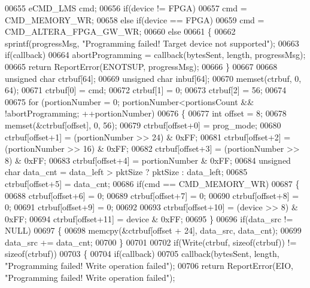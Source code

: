 \begin{DoxyCode}
{{{{{00655     eCMD_LMS cmd;
00656     \textcolor{keywordflow}{if}(device != FPGA)
00657         cmd = CMD_MEMORY_WR;
00658     \textcolor{keywordflow}{else} \textcolor{keywordflow}{if}(device == FPGA)
00659         cmd = CMD_ALTERA_FPGA_GW_WR;
00660     \textcolor{keywordflow}{else}
00661     \{
00662         sprintf(progressMsg, \textcolor{stringliteral}{"Programming failed! Target device not supported"});
00663         \textcolor{keywordflow}{if}(callback)
00664             abortProgramming = callback(bytesSent, length, progressMsg);
00665         \textcolor{keywordflow}{return} ReportError(ENOTSUP, progressMsg);
00666     \}
00667 
00668     \textcolor{keywordtype}{unsigned} \textcolor{keywordtype}{char} ctrbuf[64];
00669     \textcolor{keywordtype}{unsigned} \textcolor{keywordtype}{char} inbuf[64];
00670     memset(ctrbuf, 0, 64);
00671     ctrbuf[0] = cmd;
00672     ctrbuf[1] = 0;
00673     ctrbuf[2] = 56;
00674 
00675     \textcolor{keywordflow}{for} (portionNumber = 0; portionNumber<portionsCount && !abortProgramming; ++portionNumber)
00676     \{
00677         \textcolor{keywordtype}{int} offset = 8;
00678         memset(&ctrbuf[offset], 0, 56);
00679         ctrbuf[offset+0] = prog\_mode;
00680         ctrbuf[offset+1] = (portionNumber >> 24) & 0xFF;
00681         ctrbuf[offset+2] = (portionNumber >> 16) & 0xFF;
00682         ctrbuf[offset+3] = (portionNumber >> 8) & 0xFF;
00683         ctrbuf[offset+4] = portionNumber & 0xFF;
00684         \textcolor{keywordtype}{unsigned} \textcolor{keywordtype}{char} data\_cnt = data\_left > pktSize ? pktSize : data\_left;
00685         ctrbuf[offset+5] = data\_cnt;
00686         \textcolor{keywordflow}{if}(cmd == CMD_MEMORY_WR)
00687         \{
00688             ctrbuf[offset+6] = 0;
00689             ctrbuf[offset+7] = 0;
00690             ctrbuf[offset+8] = 0;
00691             ctrbuf[offset+9] = 0;
00692 
00693             ctrbuf[offset+10] = (device >> 8) & 0xFF;
00694             ctrbuf[offset+11] = device & 0xFF;
00695         \}
00696         \textcolor{keywordflow}{if}(data\_src != NULL)
00697         \{
00698             memcpy(&ctrbuf[offset + 24], data\_src, data\_cnt);
00699             data\_src += data\_cnt;
00700         \}
00701 
00702         \textcolor{keywordflow}{if}(Write(ctrbuf, \textcolor{keyword}{sizeof}(ctrbuf)) != \textcolor{keyword}{sizeof}(ctrbuf))
00703         \{
00704             \textcolor{keywordflow}{if}(callback)
00705                 callback(bytesSent, length, \textcolor{stringliteral}{"Programming failed! Write operation failed"});
00706             \textcolor{keywordflow}{return} ReportError(EIO, \textcolor{stringliteral}{"Programming failed! Write operation failed"});
}}}}}
\end{DoxyCode}
